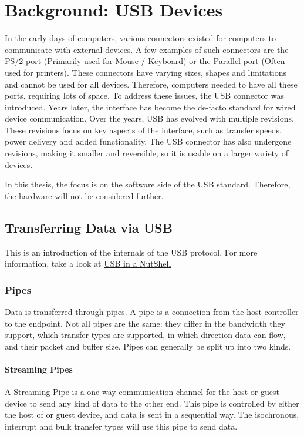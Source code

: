 \chapter{Background: USB Devices}
\label{chap:rel_work}
In the early days of computers, various connectors existed for computers to communicate with external devices. A few examples of such connectors are the PS/2 port (Primarily used for Mouse / Keyboard) or the Parallel port (Often used for printers). These connectors have varying sizes, shapes and limitations and cannot be used for all devices. Therefore, computers needed to have all these ports, requiring lots of space. To address these issues, the USB connector was introduced. Years later, the interface has become the de-facto standard for wired device communication. Over the years, USB has evolved with multiple revisions. These revisions focus on key aspects of the interface, such as transfer speeds, power delivery and added functionality. The USB connector has also undergone revisions, making it smaller and reversible, so it is usable on a larger variety of devices.

In this thesis, the focus is on the software side of the USB standard. Therefore, the hardware will not be considered further.

\section{Transferring Data via USB}

This is an introduction of the internals of the USB protocol. For more information, take a look at \href{https://www.beyondlogic.org/usbnutshell/usb1.shtml}{USB in a NutShell}
\subsection{Pipes}
Data is transferred through pipes. A pipe is a connection from the host controller to the endpoint. Not all pipes are the same: they differ in the bandwidth they support, which transfer types are supported, in which direction data can flow, and their packet and buffer size. Pipes can generally be split up into two kinds.

\subsubsection{Streaming Pipes}
A Streaming Pipe is a one-way communication channel for the host or guest device to send any kind of data to the other end. This pipe is controlled by either the host of or guest device, and data is sent in a sequential way. The isochronous, interrupt and bulk transfer types will use this pipe to send data.

